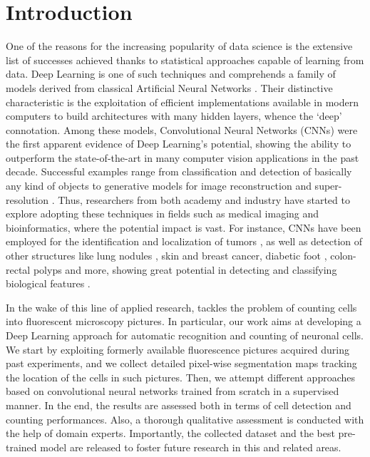 \chapter{Introduction}
\label{chap:partI_intro}

One of the reasons for the increasing popularity of data science is the extensive list of successes achieved thanks to statistical approaches capable of learning from data.
Deep Learning is one of such techniques and comprehends a family of models derived from classical Artificial Neural Networks \cite{Rosenblatt1957}. Their distinctive characteristic is the exploitation of efficient implementations available in modern computers to build architectures with many hidden layers, whence the `deep' connotation.
Among these models, Convolutional Neural Networks (CNNs) \cite{jimenez, greenspan} were the first apparent evidence of Deep Learning's potential, showing the ability to outperform the state-of-the-art in many computer vision applications in the past decade. 
Successful examples range from classification and detection of basically any kind of objects \cite{AlexNet, YOLO} to generative models for image reconstruction \cite{reconstruction} and super-resolution \cite{super-resolution}.
Thus, researchers from both academy and industry have started to explore adopting these techniques in fields such as medical imaging and bioinformatics, where the potential impact is vast.
For instance, CNNs have been employed for the identification and localization of tumors \cite{brain_tumor,breast_cancer, ciresan2012deep, cirecsan2013mitosis}, as well as detection of other structures like lung nodules \cite{lung_nodules, meraj2020lung, su2021lung}, skin and breast cancer, diabetic foot \cite{TL_medical_imaging}, colon-rectal polyps \cite{korbar} and more, showing great potential in detecting and classifying biological features \cite{lundervold, sahiner, yadav}.

In the wake of this line of applied research,  tackles the problem of counting cells into fluorescent microscopy pictures.
In particular, our work aims at developing a Deep Learning approach for automatic recognition and counting of neuronal cells.
We start by exploiting formerly available fluorescence pictures acquired during past experiments, and we collect detailed pixel-wise segmentation maps tracking the location of the cells in such pictures.
Then, we attempt different approaches based on convolutional neural networks trained from scratch in a supervised manner.
In the end, the results are assessed both in terms of cell detection and counting performances. Also, a thorough qualitative assessment is conducted with the help of domain experts.
Importantly, the collected dataset and the best pre-trained model are released to foster future research in this and related areas. 

